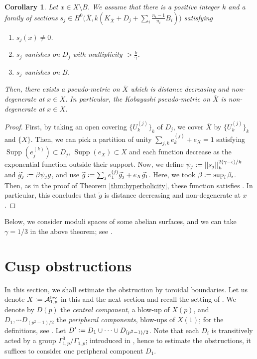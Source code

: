 \documentclass[12pt, pdftex]{amsart}
\theoremstyle{plain}
\newtheorem{cor}[thm]{Corollary}
\theoremstyle{definition}
\numberwithin{equation}{section}
\def\A{{\mathbb A}}
\def\lev{\mathrm{lev}}
\def\A{\mathcal{A}}
\def\Supp{\mathop{\mathrm{Supp}}\nolimits}
\newcommand{\defeq}{\vcentcolon=}
\begin{document}
\begin{cor}
\label{cor:hyperbolicity_family}
Let $x\in X\setminus B$.
We assume that there is a positive integer $k$ and a family of sections $s_j\in H^0\bigl(\overline{X}, k(K_{\overline{X}}+D_j+\sum_i \frac{n_i-1}{n_i}B_i)\bigr)$ satisfying 
\begin{enumerate}
\item $s_j(x)\neq 0$.
\item $s_j$ vanishes on $D_j$ with multiplicity $>\frac{k}{\gamma}$.
\item $s_j$ vanishes on $B$.
\end{enumerate}
Then, there exists a pseudo-metric on $\overline{X}$ which is distance decreasing and  non-degenerate at $x\in X$.
In particular, the Kobayashi pseudo-metric on $\overline{X}$ is non-degenerate at $x\in X$.
\end{cor}
\begin{proof}
First, by taking an open covering $\{U_k^{(j)}\}_k$ of $D_j$, we cover $\overline{X}$ by $\{U_k^{(j)}\}_k$ and $\{X\}$.
Then, we can pick a partition of unity $\sum_{j,k} e_k^{(j)} + e_X =1$ satisfying $\Supp(e^{(k)}_j)\subset D_j$, $\Supp(e_X)\subset X$ and each function decrease as the exponential function outside their support.
Now, we define $\psi_j\defeq ||s_j||_h^{2(\gamma-\epsilon)/k}$ and $\widetilde{g_j}\defeq \beta \psi_j g$, and use $\widetilde{g}\defeq \sum_je^{(j)}_1\widetilde{g_j} + e_X\widetilde{g_1}$.
Here, we took $\beta \defeq \sup_i{\beta_i}$.
Then, as in the proof of Theorem \ref{thm:hyperbolicity}, these function satisfies \cite[Proposition 2.2, 2.3, 2.4]{Ro16}.
In particular, this concludes that $\widetilde{g}$ is distance decreasing and non-degenerate at $x$.
\end{proof}

Below, we consider moduli spaces of some abelian surfaces, and we can take $\gamma=1/3$ in the above theorem; see \cite[Section 4]{Ro16}.

\section{Cusp obstructions}
In this section, we shall estimate the obstruction by toroidal boundaries.
Let us denote $X\defeq\A_{1,p}^{\lev}$ in this and the next section and  recall the setting of \cite{HS94}.
We denote by $D(p)$ the \textit{central component}, a blow-up of $X(p)$, and $D_1,\cdots D_{(p^2-1)/2}$ the \textit{peripheral components}, blow-ups of $X(1)$; for the definitions, see \cite[Section 1]{HS94}.
Let $D'\defeq D_1\cup \dots \cup D_{(p^2-1)/2}$.
Note that each $D_i$ is transitively acted by a group $\Gamma_{1,p}^0/\Gamma_{1,p}$; introduced in \cite[Section 1]{HS94}, hence to estimate the obstructions, it suffices to consider one peripheral component $D_1$.
\end{document}
